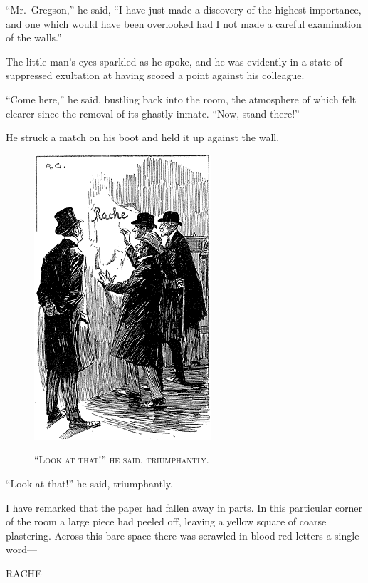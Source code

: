 \documentclass[12pt,english,oneside]{book}
\newcommand{\noun}[1]{\textsc{#1}}
\begin{document}
{}``Mr.\ Gregson,'' he said, {}``I have just made a discovery
of the highest importance, and one which would have been overlooked
had I not made a careful examination of the walls.''

The little man's eyes sparkled as he spoke, and he was evidently in
a state of suppressed exultation at having scored a point against
his colleague.

{}``Come here,'' he said, bustling back into the room, the atmosphere
of which felt clearer since the removal of its ghastly inmate. {}``Now,
stand there!''

He struck a match on his boot and held it up against the wall.

%
\begin{figure}[htbp]
\noindent \begin{center}\includegraphics{images/study10-stud-06.png}\end{center}

\noindent \begin{center}\noun{{}``Look at that!'' he said, triumphantly.}\end{center}
\end{figure}
{}``Look at that!'' he said, triumphantly.

I have remarked that the paper had fallen away in parts. In this particular
corner of the room a large piece had peeled off, leaving a yellow
square of coarse plastering. Across this bare space there was scrawled
in blood-red letters a single word---

\noindent \begin{center}RACHE\end{center}
\end{document}
